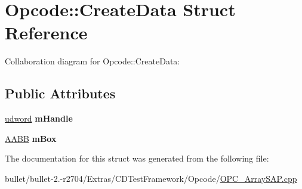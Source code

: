 \hypertarget{struct_opcode_1_1_create_data}{\section{Opcode\+:\+:Create\+Data Struct Reference}
\label{struct_opcode_1_1_create_data}
}


Collaboration diagram for Opcode\+:\+:Create\+Data\+:
\subsection*{Public Attributes}
\begin{DoxyCompactItemize}
\item 
\hypertarget{struct_opcode_1_1_create_data_afb523ecd1045b4e62c9a9a812e9d524f}{\hyperlink{_ice_types_8h_a44c6f1920ba5551225fb534f9d1a1733}{udword} {\bfseries m\+Handle}}\label{struct_opcode_1_1_create_data_afb523ecd1045b4e62c9a9a812e9d524f}

\item 
\hypertarget{struct_opcode_1_1_create_data_a1bad92cdec2091e7f35b39001f2b0e44}{\hyperlink{class_a_a_b_b}{A\+A\+B\+B} {\bfseries m\+Box}}\label{struct_opcode_1_1_create_data_a1bad92cdec2091e7f35b39001f2b0e44}

\end{DoxyCompactItemize}


The documentation for this struct was generated from the following file\+:\begin{DoxyCompactItemize}
\item 
bullet/bullet-\/2.-\/r2704/\+Extras/\+C\+D\+Test\+Framework/\+Opcode/\hyperlink{_o_p_c___array_s_a_p_8cpp}{O\+P\+C\+\_\+\+Array\+S\+A\+P.\+cpp}\end{DoxyCompactItemize}
